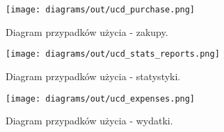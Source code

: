 \begin{figure}[!htb]
    \centering
    \begin{minipage}[b]{0.45\textwidth}
        \texttt{[image: diagrams/out/ucd\_purchase.png]}
        \caption{Diagram przypadków użycia - zakupy.}
    \end{minipage}
    \hfill
    \begin{minipage}[b]{0.45\textwidth}
        \texttt{[image: diagrams/out/ucd\_stats\_reports.png]}
        \caption{Diagram przypadków użycia - statystyki.}
    \end{minipage}
\end{figure}
\clearpage
\begin{figure}[!htb]
    \centering
    \texttt{[image: diagrams/out/ucd\_expenses.png]}
    \caption{Diagram przypadków użycia - wydatki.}
\end{figure}
